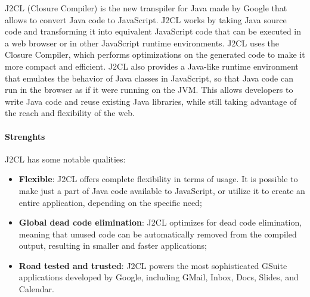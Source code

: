 J2CL (Closure Compiler) is the new transpiler for Java made by Google that allows to convert Java code to JavaScript. J2CL works by taking Java source code and transforming it into equivalent JavaScript code that can be executed in a web browser or in other JavaScript runtime environments. J2CL uses the Closure Compiler, which performs optimizations on the generated code to make it more compact and efficient. J2CL also provides a Java-like runtime environment that emulates the behavior of Java classes in JavaScript, so that Java code can run in the browser as if it were running on the JVM. This allows developers to write Java code and reuse existing Java libraries, while still taking advantage of the reach and flexibility of the web.

\paragraph{Strenghts} J2CL has some notable qualities:
\begin{itemize}
	\item \textbf{Flexible}: J2CL offers complete flexibility in terms of usage. It is possible to make just a part of Java code available to JavaScript, or utilize it to create an entire application, depending on the specific need;
	\item \textbf{Global dead code elimination}: J2CL optimizes for dead code elimination, meaning that unused code can be automatically removed from the compiled output, resulting in smaller and faster applications;
	\item \textbf{Road tested and trusted}: J2CL powers the most sophisticated GSuite applications developed by Google, including GMail, Inbox, Docs, Slides, and Calendar.
\end{itemize}

